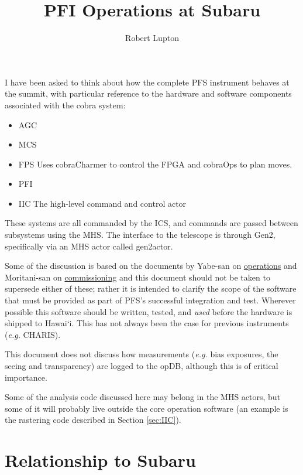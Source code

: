 \documentclass[12pt]{article}
\newcommand{\eg}{\textit{e.g.}\xspace}
\newcommand{\AGC}{\gls{AGC}\xspace}
\newcommand{\ICS}{\gls{ICS}\xspace}
\newcommand{\IIC}{\gls{IIC}\xspace}
\newcommand{\MCS}{\gls{MCS}\xspace}
\newcommand{\MHS}{\gls{MHS}\xspace}
\newcommand{\FPS}{\gls{FPS}\xspace}
\newcommand{\opDB}{\gls{opDB}\xspace}
\newcommand{\PFI}{\gls{PFI}\xspace}
\newcommand{\PFS}{\gls{PFS}\xspace}
\newcommand{\secRef}[1]{Section \ref{sec:#1}}
\begin{document}
\title{\acrshort{PFI} Operations at Subaru}
\author{Robert Lupton}
\maketitle


I have been asked to think about how the complete \PFS instrument behaves at the summit, with particular
reference to the hardware and software components associated with the cobra system:
\begin{itemize}
\item\AGC
\item\MCS
\item\FPS
  Uses \gls{cobraCharmer} to control the \gls{FPGA} and \gls{cobraOps} to plan moves. 
\item\PFI
\item\IIC
  The high-level command and control actor
\end{itemize}

These systems are all commanded by the \ICS, and commands are passed between subsystems
using the \MHS. The interface to the telescope is through \gls{Gen2}, specifically via an \MHS
actor called \gls{gen2actor}.

Some of the discussion is based on the
documents by Yabe-san on \href{https://github.com/Subaru-PFS/doc/tree/master/operation}{operations} and
Moritani-san on 
\href{https://github.com/Subaru-PFS/ics\_doc/blob/master/commissioning/commissioning\_details.pdf}{commissioning} and this document should not be taken to supersede either of these;  rather it is intended to clarify the
scope of the software that must be provided as part of \PFS's successful integration and test.  Wherever
possible this software should be written, tested, and \textit{used} before the hardware is shipped to Hawai`i.
This has not always been the case for previous instruments (\eg CHARIS).

This document does not discuss how measurements (\eg bias exposures, the seeing and transparency) are logged
to the \opDB, although this is of critical importance.

Some of the analysis code discussed here may belong in the \MHS actors, but some of it will probably
live outside the core operation software (an example is the rastering code described in \secRef{IIC}).

\section{Relationship to Subaru}
\end{document}
